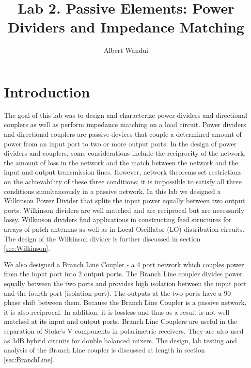 \documentclass[twocolumn, aps, apl]{revtex4-1}
\begin{document}
\title{Lab 2. Passive Elements: Power Dividers and Impedance Matching }
\author{Albert Wandui}
\maketitle

\section*{Introduction}
The goal of this lab was to design and characterize power dividers and directional couplers as well as perform impedance matching on a load circuit. Power dividers and directional couplers are passive devices that couple a determined amount of power from an input port to two or more output ports. In the design of power dividers and couplers, some considerations include the reciprocity of the network, the amount of loss in the network and the match between the network and the input and output transmission lines. However, network theorems set restrictions on the achievability of these three conditions; it is impossible to satisfy all three conditions simultaneously in a passive network. In this lab we designed a Wilkinson Power Divider that splits the input power equally between two output ports. Wilkinson dividers are well matched and are reciprocal but are necessarily lossy. Wilkinson dividers find applications in constructing feed structures for arrays of patch antennas as well as in Local Oscillator (LO) distribution circuits. The design of the Wilkinson divider is further discussed in section \ref{sec:Wilkinson}.  

We also designed a Branch Line Coupler - a 4 port network which couples power from the input port into 2 output ports. The Branch Line coupler divides power equally between the two ports and provides high isolation between the input port and the fourth port (isolation port). The outputs at the two ports have a 90 \textdegree phase shift between them. Because the Branch Line Coupler is a passive network, it is also reciprocal. In addition, it is lossless and thus as a result is not well matched at its input and output ports. Branch Line Couplers are useful in the separation of Stoke's V components in polarimetric receivers. They are also used as 3dB hybrid circuits for double balanced mixers. The design, lab testing and analysis of the Branch Line coupler is discussed at length in section \ref{sec:BranchLine}.
\end{document}
